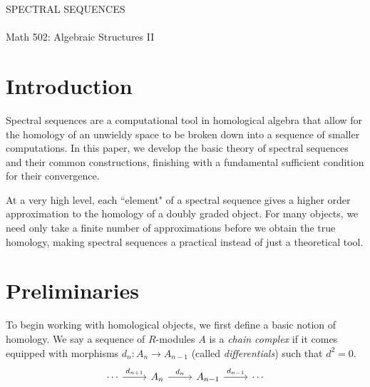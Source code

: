 \documentclass[twoside,10pt]{article}
\begin{document}
\begin{center}
        {\huge \sffamily \MakeUppercase{Spectral Sequences}}\\
	\vspace{3mm}
        {\large \sffamily {}}\\
        \vspace{3mm}
        {Math 502: Algebraic Structures II}
        \vspace{5mm}
\end{center}

\thispagestyle{empty}



\section{Introduction}

Spectral sequences are a computational tool in homological algebra that allow for the homology of an unwieldy space to be broken down into a sequence of smaller computations. In this paper, we develop the basic theory of spectral sequences and their common constructions, finishing with a fundamental sufficient condition for their convergence.

At a very high level, each ``element" of a spectral sequence gives a higher order approximation to the homology of a doubly graded object. For many objects, we need only take a finite number of approximations before we obtain the true homology, making spectral sequences a practical instead of just a theoretical tool.


\section{Preliminaries}

To begin working with homological objects, we first define a basic notion of homology. We say a sequence of $R$-modules $A$ is a \textit{chain complex} if it comes equipped with morphisms $ d_n:A_{n}\to A_{n-1}$ (called \textit{differentials}) such that $d^2 =0$.
\[
	\begin{tikzcd}
		\cdots \arrow[r,"d_{n+1}"] & A_n \arrow[r,"d_n"] & A_{n-1} \arrow[r,"d_{n-1}"] & \cdots
	\end{tikzcd}
\]
\end{document}
